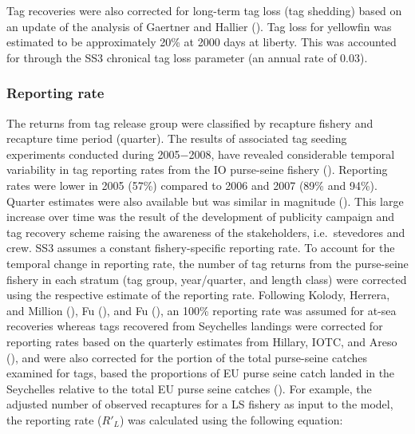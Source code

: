 \documentclass[
]{scrartcl}
\begin{document}
Tag recoveries were also corrected for long-term tag loss (tag shedding)
based on an update of the analysis of Gaertner and Hallier
(). Tag loss for
yellowfin was estimated to be approximately 20\% at 2000 days at
liberty. This was accounted for through the SS3 chronical tag loss
parameter (an annual rate of 0.03).

\subsubsection{Reporting rate}\label{reporting-rate}

The returns from tag release group were classified by recapture fishery
and recapture time period (quarter). The results of associated tag
seeding experiments conducted during 2005−2008, have revealed
considerable temporal variability in tag reporting rates from the IO
purse-seine fishery
().
Reporting rates were lower in 2005 (57\%) compared to 2006 and 2007
(89\% and 94\%). Quarter estimates were also available but was similar
in magnitude (). This large increase over time was the result of
the development of publicity campaign and tag recovery scheme raising
the awareness of the stakeholders, i.e.~stevedores and crew. SS3 assumes
a constant fishery-specific reporting rate. To account for the temporal
change in reporting rate, the number of tag returns from the purse-seine
fishery in each stratum (tag group, year/quarter, and length class) were
corrected using the respective estimate of the reporting rate. Following
Kolody, Herrera, and Million
(), Fu
(), and Fu
(), an 100\% reporting
rate was assumed for at-sea recoveries whereas tags recovered from
Seychelles landings were corrected for reporting rates based on the
quarterly estimates from Hillary, IOTC, and Areso
(), and were also
corrected for the portion of the total purse-seine catches examined for
tags, based the proportions of EU purse seine catch landed in the
Seychelles relative to the total EU purse seine catches
(). For example, the adjusted number of observed recaptures
for a LS fishery as input to the model, the reporting rate (\(R'_L\))
was calculated using the following equation:
\end{document}
